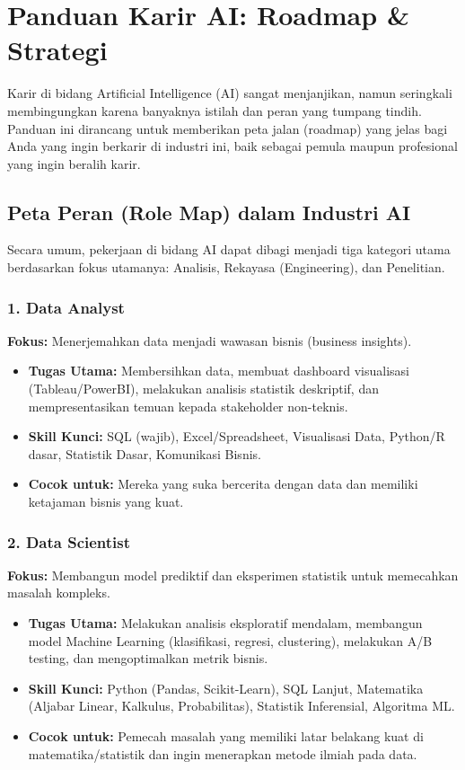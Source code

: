 \chapter{Panduan Karir AI: Roadmap \& Strategi}
\label{chap:career}

Karir di bidang Artificial Intelligence (AI) sangat menjanjikan, namun seringkali membingungkan karena banyaknya istilah dan peran yang tumpang tindih. Panduan ini dirancang untuk memberikan peta jalan (roadmap) yang jelas bagi Anda yang ingin berkarir di industri ini, baik sebagai pemula maupun profesional yang ingin beralih karir.

\section{Peta Peran (Role Map) dalam Industri AI}

Secara umum, pekerjaan di bidang AI dapat dibagi menjadi tiga kategori utama berdasarkan fokus utamanya: Analisis, Rekayasa (Engineering), dan Penelitian.

\subsection{1. Data Analyst}
\textbf{Fokus:} Menerjemahkan data menjadi wawasan bisnis (business insights).
\begin{itemize}
    \item \textbf{Tugas Utama:} Membersihkan data, membuat dashboard visualisasi (Tableau/PowerBI), melakukan analisis statistik deskriptif, dan mempresentasikan temuan kepada stakeholder non-teknis.
    \item \textbf{Skill Kunci:} SQL (wajib), Excel/Spreadsheet, Visualisasi Data, Python/R dasar, Statistik Dasar, Komunikasi Bisnis.
    \item \textbf{Cocok untuk:} Mereka yang suka bercerita dengan data dan memiliki ketajaman bisnis yang kuat.
\end{itemize}

\subsection{2. Data Scientist}
\textbf{Fokus:} Membangun model prediktif dan eksperimen statistik untuk memecahkan masalah kompleks.
\begin{itemize}
    \item \textbf{Tugas Utama:} Melakukan analisis eksploratif mendalam, membangun model Machine Learning (klasifikasi, regresi, clustering), melakukan A/B testing, dan mengoptimalkan metrik bisnis.
    \item \textbf{Skill Kunci:} Python (Pandas, Scikit-Learn), SQL Lanjut, Matematika (Aljabar Linear, Kalkulus, Probabilitas), Statistik Inferensial, Algoritma ML.
    \item \textbf{Cocok untuk:} Pemecah masalah yang memiliki latar belakang kuat di matematika/statistik dan ingin menerapkan metode ilmiah pada data.
\end{itemize}

